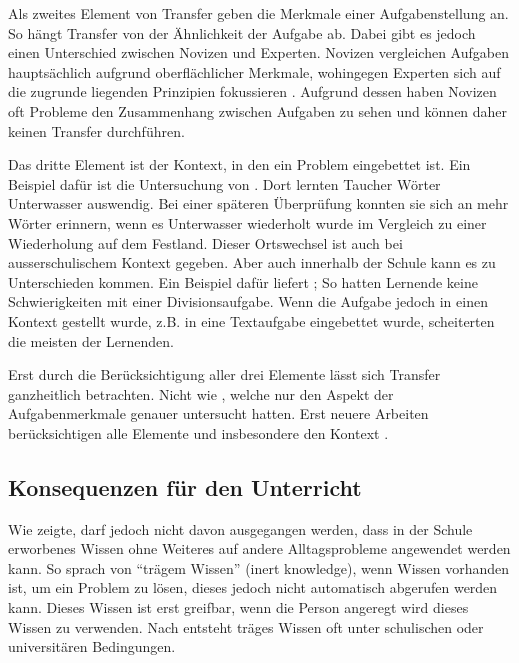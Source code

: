Als zweites Element von Transfer geben \citeauthor{Marini1995} die Merkmale einer Aufgabenstellung an. So hängt Transfer von der Ähnlichkeit der Aufgabe ab. Dabei gibt es jedoch einen Unterschied zwischen Novizen und Experten. Novizen vergleichen Aufgaben hauptsächlich aufgrund oberflächlicher Merkmale, wohingegen Experten sich auf die zugrunde liegenden Prinzipien fokussieren \citep[s. S. 279]{Marini1995}. Aufgrund dessen haben Novizen oft Probleme den Zusammenhang zwischen Aufgaben zu sehen und können daher keinen Transfer durchführen.

Das dritte Element ist der Kontext, in den ein Problem eingebettet ist. Ein Beispiel dafür ist die Untersuchung von \citet{Godden1975}. Dort lernten Taucher Wörter Unterwasser auswendig. Bei einer späteren Überprüfung konnten sie sich an mehr Wörter erinnern, wenn es Unterwasser wiederholt wurde im Vergleich zu einer Wiederholung auf dem Festland. Dieser Ortswechsel ist auch bei ausserschulischem Kontext gegeben. Aber auch innerhalb der Schule kann es zu Unterschieden kommen. Ein Beispiel dafür liefert \citet{Schoenfeld1988}; So hatten Lernende keine Schwierigkeiten mit einer Divisionsaufgabe. Wenn die Aufgabe jedoch in einen Kontext gestellt wurde, z.B. in eine Textaufgabe eingebettet wurde, scheiterten die meisten der Lernenden. 

Erst durch die Berücksichtigung aller drei Elemente lässt sich Transfer ganzheitlich betrachten. Nicht wie  \citet{Woodworth1901}, welche nur den Aspekt der Aufgabenmerkmale genauer untersucht hatten. Erst neuere Arbeiten berücksichtigen alle Elemente und insbesondere den Kontext \citep{Lobato2002a, Detterman1993, Greeno1996}.

\subsection{Konsequenzen für den Unterricht}
\label{sec:TransferUnterricht}

Wie \citet{claxton1990} zeigte, darf jedoch nicht davon ausgegangen werden, dass in der Schule erworbenes Wissen ohne Weiteres auf andere Alltagsprobleme angewendet werden kann. So sprach \citet{Whitehead1929} von "`trägem Wissen"' (inert knowledge), wenn Wissen vorhanden ist, um ein Problem zu lösen, dieses jedoch nicht automatisch abgerufen werden kann. Dieses Wissen ist erst greifbar, wenn die Person angeregt wird dieses Wissen zu verwenden. Nach \citet{Whitehead1929} entsteht träges Wissen oft unter schulischen oder universitären Bedingungen. 



